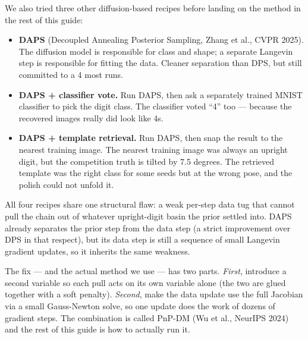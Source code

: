 \documentclass[11pt]{article}
\begin{document}
We also tried three other diffusion-based recipes before landing on
the method in the rest of this guide:
\begin{itemize}[leftmargin=2em]
\item \textbf{DAPS} (Decoupled Annealing Posterior Sampling, Zhang et al.,
  CVPR 2025). The diffusion model is responsible for class and shape;
  a separate Langevin step is responsible for fitting the data. Cleaner
  separation than DPS, but still committed to a 4 most runs.
\item \textbf{DAPS + classifier vote.} Run DAPS, then ask a separately
  trained MNIST classifier to pick the digit class. The classifier voted
  ``4'' too --- because the recovered images really did look like 4s.
\item \textbf{DAPS + template retrieval.} Run DAPS, then snap the
  result to the nearest training image. The nearest training image was
  always an upright digit, but the competition truth is tilted by 7.5
  degrees. The retrieved template was the right class for some seeds
  but at the wrong pose, and the polish could not unfold it.
\end{itemize}

All four recipes share one structural flaw: a weak per-step data tug
that cannot pull the chain out of whatever upright-digit basin the
prior settled into. DAPS already separates the prior step from the
data step (a strict improvement over DPS in that respect), but its
data step is still a sequence of small Langevin gradient updates, so
it inherits the same weakness.

The fix --- and the actual method we use --- has two parts. \emph{First},
introduce a second variable so each pull acts on its own variable
alone (the two are glued together with a soft penalty). \emph{Second},
make the data update use the full Jacobian via a small Gauss-Newton
solve, so one update does the work of dozens of gradient steps. The
combination is called PnP-DM (Wu et al., NeurIPS 2024) and the rest of
this guide is how to actually run it.
\end{document}
